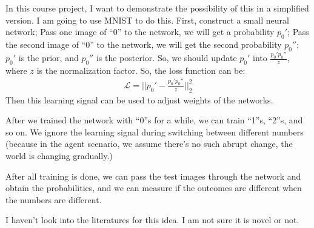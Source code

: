 In this course project, I want to demonstrate the possibility of this in a simplified version.
I am going to use MNIST to do this.
First, construct a small neural network;
Pass one image of ``0'' to the network, we will get a probability $p_0'$;
Pass the second image of ``0'' to the network, we will get the second probability $p_0''$;
$p_0'$ is the prior, and $p_0''$ is the posterior.
So, we should update $p_0'$ into $\frac{p_0' p_0''}{z}$, where $z$ is the normalization factor.
So, the loss function can be:
\begin{align*}
    \mathcal{L} = ||p_0' - \frac{p_0' p_0''}{z}||_2^2
\end{align*}
Then this learning signal can be used to adjust weights of the networks.

After we trained the network with ``0''s for a while, we can train ``1''s, ``2''s, and so on.
We ignore the learning signal during switching between different numbers (because in the agent scenario, we assume there's no such abrupt change, the world is changing gradually.)

After all training is done, we can pass the test images through the network and obtain the probabilities, 
and we can measure if the outcomes are different when the numbers are different.

I haven't look into the literatures for this idea.
I am not sure it is novel or not.

